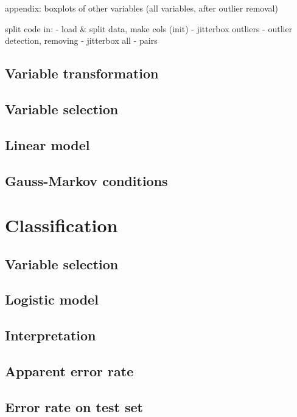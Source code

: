 \documentclass[a4paper, 12pt]{article}
\begin{document}

appendix: boxplots of other variables (all variables, after outlier removal)



split code in:
- load \& split data, make cols (init)
- jitterbox outliers
- outlier detection, removing
- jitterbox all
- pairs



\subsection*{Variable transformation}
\subsection*{Variable selection}
\subsection*{Linear model}
\subsection*{Gauss-Markov conditions}

\section{Classification}
\subsection*{Variable selection}
\subsection*{Logistic model}
\subsection*{Interpretation}
\subsection*{Apparent error rate}
\subsection*{Error rate on test set}
\end{document}
